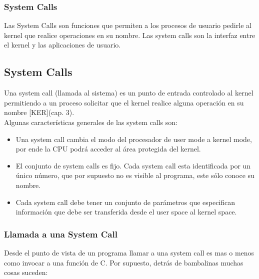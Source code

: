 \documentclass[../main.tex]{subfiles}
\begin{document}
        \subsubsection*{System Calls}
            Las System Calls son funciones que permiten a los procesos de usuario pedirle al kernel que realice operaciones en su nombre. Las system calls son la interfaz entre el kernel y las aplicaciones de usuario.\\

    \subsection*{System Calls}
        Una system call (llamada al sistema) es un punto de entrada controlado al kernel permitiendo a un proceso solicitar que el kernel realice alguna operación en su nombre [KER](cap. 3).\\

        Algunas características generales de las system calls son:
        \begin{itemize}
            \item Una system call cambia el modo del procesador de user mode a kernel mode, por ende la CPU podrá acceder al área protegida del kernel.
            \item El conjunto de system calls es fijo. Cada system call esta identificada por un único número, que por supuesto no es visible al programa, este sólo conoce su nombre.
            \item Cada system call debe tener un conjunto de parámetros que especifican información que debe ser transferida desde el user space al kernel space.
        \end{itemize}

        \subsubsection*{Llamada a una System Call}
            Desde el punto de vista de un programa llamar a una system call es mas o menos como invocar a una función de C. Por supuesto, detrás de bambalinas muchas cosas suceden:
\end{document}
